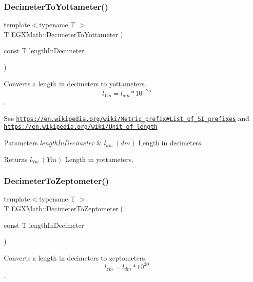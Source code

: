 \subsubsection{\texorpdfstring{Decimeter\+To\+Yottameter()}{DecimeterToYottameter()}}
{\footnotesize\ttfamily template$<$typename T $>$ \\
T E\+G\+X\+Math\+::\+Decimeter\+To\+Yottameter (\begin{DoxyParamCaption}\item[{const T}]{length\+In\+Decimeter }\end{DoxyParamCaption})}



Converts a length in decimeters to yottameters. \[ l_{Ym}=l_{dm} * 10^{-25} \]. 

See \href{https://en.wikipedia.org/wiki/Metric_prefix#List_of_SI_prefixes}{\tt https\+://en.\+wikipedia.\+org/wiki/\+Metric\+\_\+prefix\#\+List\+\_\+of\+\_\+\+S\+I\+\_\+prefixes} and \href{https://en.wikipedia.org/wiki/Unit_of_length}{\tt https\+://en.\+wikipedia.\+org/wiki/\+Unit\+\_\+of\+\_\+length} 
\begin{DoxyParams}{Parameters}
{\em length\+In\+Decimeter} & $ l_{dm}\ (dm)$ Length in decimeters. \\
\hline
\end{DoxyParams}
\begin{DoxyReturn}{Returns}
$ l_{Ym}\ (Ym)$ Length in yottameters. 
\end{DoxyReturn}
\mbox{\label{group___e_g_x_math-_conversions-_length_conversions-_decimeter-_s_i_ga5462e9c56431f0cf1daeafb729eeed24}} 
\subsubsection{\texorpdfstring{Decimeter\+To\+Zeptometer()}{DecimeterToZeptometer()}}
{\footnotesize\ttfamily template$<$typename T $>$ \\
T E\+G\+X\+Math\+::\+Decimeter\+To\+Zeptometer (\begin{DoxyParamCaption}\item[{const T}]{length\+In\+Decimeter }\end{DoxyParamCaption})}



Converts a length in decimeters to zeptometers. \[ l_{zm}=l_{dm} * 10^{20} \]. 

